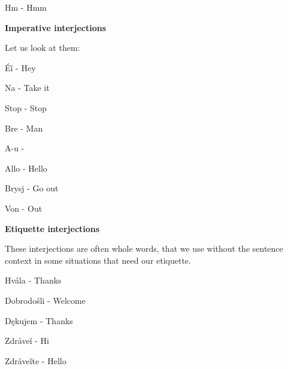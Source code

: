 Hm - Hmm

\textbf{Imperative interjections}

Let us look at them:

Éǐ - Hey

Na - Take it

Stop - Stop

Bre - Man

A-u - 

Allo - Hello

Brysj - Go out

Von - Out

\textbf{Etiquette interjections}

These interjections are often whole words, that we use without the sentence context in some situations that need our etiquette.

Hvála - Thanks

Dobrodošli - Welcome

Dękujem - Thanks

Zdråveǐ - Hi

Zdråveǐte - Hello
